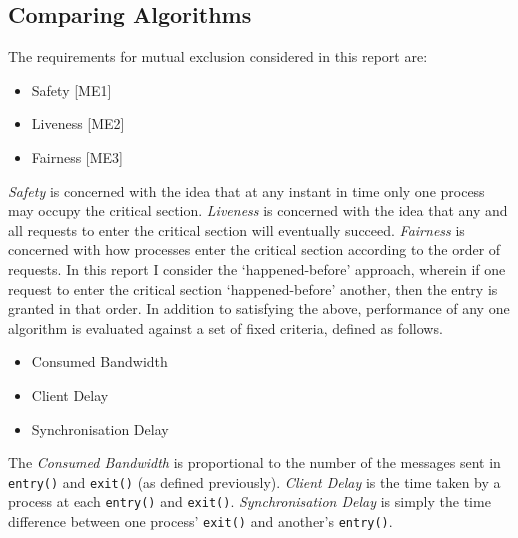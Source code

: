 \documentclass[conference]{IEEEtran}
\begin{document}
\subsection{Comparing Algorithms}
The requirements for mutual exclusion considered in this report are:
\begin{itemize}
  \item Safety [ME1]
  \item Liveness [ME2]
  \item Fairness [ME3]
\end{itemize}
\textit{Safety} is concerned with the idea that at any instant in
time only one process may occupy the critical section. \textit{Liveness} is
concerned with the idea that any and all requests to enter the critical section
will eventually succeed. \textit{Fairness} is concerned with
how processes enter the critical section according to the order of requests. In
this report I consider the `happened-before' approach, wherein if one request
to enter the critical section `happened-before' another, then the entry is
granted in that order.
In addition to satisfying the above, performance of any one algorithm is evaluated against a set of fixed criteria,
defined as follows.
\begin{itemize}
  \item Consumed Bandwidth
  \item Client Delay
  \item Synchronisation Delay
\end{itemize}
The \textit{Consumed Bandwidth} is proportional to the number of the messages
sent in \texttt{entry()} and \texttt{exit()} (as defined previously).
\textit{Client Delay} is the time taken by a process at each \texttt{entry()}
and \texttt{exit()}. \textit{Synchronisation Delay} is simply the time
difference between one process' \texttt{exit()} and another's \texttt{entry()}.
\end{document}
